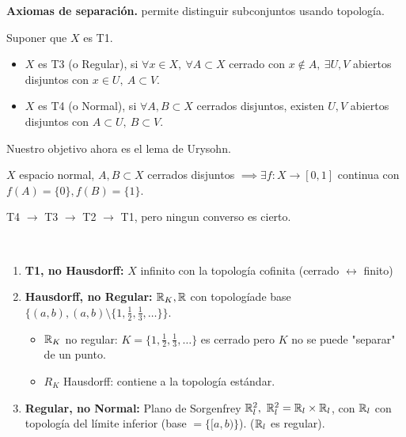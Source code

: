 
\textbf{Axiomas de separación.} permite distinguir subconjuntos usando topología.

\begin{definition}[espacio T3 y T4]
	Suponer que $X$ es T1.
	\begin{itemize}
		\item $X$ es T3 (o Regular), si $\forall x \in X,\ \forall A \subset X$ cerrado con $x \not\in A,\ \exists U,V$ abiertos disjuntos con $x \in U,\ A \subset V$.
		
		\item $X$ es T4 (o Normal), si $\forall A,B \subset X$ cerrados disjuntos, existen $U, V$ abiertos disjuntos con $A \subset U,\ B \subset V$.
	\end{itemize}
\end{definition}
\medskip
Nuestro objetivo ahora es el lema de Urysohn.

\begin{lemma}[Urysonhn]
	$X$ espacio normal, $A,B \subset X$ cerrados disjuntos $\implies \exists f : X \to [0,1]$ continua con $f(A) = \{0\}, f(B) = \{1\}$. 
\end{lemma}

\begin{remark}
	T4 $\rightarrow$ T3 $\rightarrow$ T2 $\rightarrow$ T1, pero ningun converso es cierto.
\end{remark}

\begin{eg}~
	\begin{enumerate}
		\item \textbf{T1, no Hausdorff:} $X$ infinito con la topología cofinita (cerrado $\leftrightarrow$ finito)

		\item \textbf{Hausdorff, no Regular:} $\mathbb{R}_{K},\mathbb{R}$ con topologíade base $\{(a,b), (a,b)\setminus \{1,\frac{1}{2},\frac{1}{3},\dots\}\}$.
		\begin{itemize}
			\item $\mathbb{R}_{K}$ no regular: $K = \{1, \frac{1}{2}, \frac{1}{3}, \dots\}$ es cerrado pero $K$ no se puede "separar" de un punto.

			\item $R_{K}$ Hausdorff: contiene a la topología estándar.
		\end{itemize}

		\item \textbf{Regular, no Normal:} Plano de Sorgenfrey $\mathbb{R}_{l}^{2},\ \mathbb{R}_{l}^{2} = \mathbb{R}_{l} \times \mathbb{R}_{l}$, con $\mathbb{R}_{l}$ con topología del límite inferior (base $= \{[a,b)\}$). ($\mathbb{R}_{l}$ es regular).
	\end{enumerate}
\end{eg}


